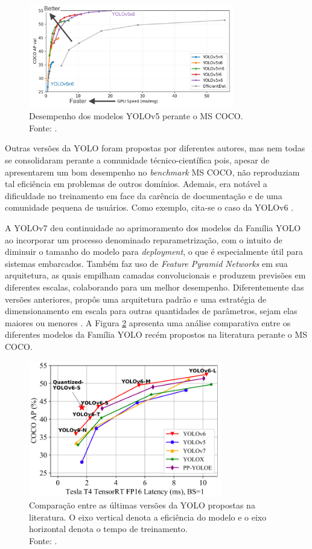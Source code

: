 \begin{figure}[h!]
    \centering
    \includegraphics[width=0.8\textwidth]{./img/yolov5}
    \caption{Desempenho dos modelos YOLOv5 perante o MS COCO.\\ Fonte: \cite{Jocher:YOLOv5}.}
    \label{fig:yolov5}
\end{figure}

Outras versões da YOLO foram propostas por diferentes autores, mas nem todas se consolidaram perante a comunidade técnico-científica pois, apesar de apresentarem um bom desempenho no \emph{benchmark} MS COCO, não reproduziam tal eficiência em problemas de outros domínios. Ademais, era notável a dificuldade no treinamento em face da carência de documentação e de uma comunidade pequena de usuários. Como exemplo, cita-se o caso da YOLOv6 \cite{YOLOv6}.


A YOLOv7 deu continuidade ao aprimoramento dos modelos da Família YOLO ao incorporar um processo denominado reparametrização, com o intuito de diminuir o tamanho do modelo para \emph{deployment}, o que é especialmente útil para sistemas embarcados. Também faz uso de \emph{Feature Pyramid Networks} em sua arquitetura, as quais empilham camadas convolucionais e produzem previsões em diferentes escalas, colaborando para um melhor desempenho. Diferentemente das versões anteriores, propôs uma arquitetura padrão e uma estratégia de dimensionamento em escala para outras quantidades de parâmetros, sejam elas maiores ou menores \cite{yolov7}. A Figura \ref{fig:yolo-arch} apresenta uma análise comparativa entre os diferentes modelos da Família YOLO recém propostos na literatura perante o MS COCO.


\begin{figure}[h!]
    \centering
    \includegraphics[width=0.75\textwidth]{img/yolo-latest-version}
    \caption{Comparação entre as últimas versões da YOLO propostas na literatura. O eixo vertical denota a eficiência do modelo e o eixo horizontal denota o tempo de treinamento.\\ Fonte: \cite{YOLOv6}.}
    \label{fig:yolo-arch}
\end{figure}